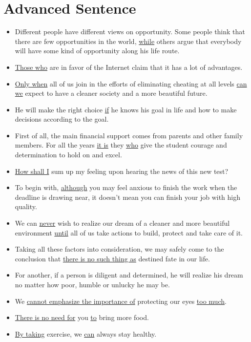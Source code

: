 \chapter{Advanced Sentence}
\begin{itemize}
    \item Different people have different views on opportunity. Some people think that
     there are few opportunities in the world, \uline{while} others argue that everybody will
      have some kind of opportunity along his life route.
    \item \uline{Those who} are in favor of the Internet claim that it has a lot of advantages.
    \item \uline{Only when} all of us join in the efforts of eliminating cheating at all levels
    \uline{can we} expect to have a cleaner society and a more beautiful future.
    \item He will make the right choice \uline{if} he knows his goal in life and how to make 
    decisions according to the goal.
    \item First of all, the main financial support comes from parents and other family
     members. For all the years \uline{it is} they \uline{who} give the student courage and 
     determination to hold on and excel.
    \item \uline{How shall I} sum up my feeling upon hearing the news of this new test?
    \item To begin with, \uline{although} you may feel anxious to finish the work when 
    the deadline is drawing near, it doesn't mean you can finish your job with 
    high quality.
    \item We can \uline{never} wish to realize our dream of a cleaner and more beautiful
     environment \uline{until} all of us take actions to build, protect and take care of it.
    \item Taking all these factors into consideration, we may safely come to the conclusion
     that \uline{there is no such thing as} destined fate in our life.
    \item For another, if a person is diligent and determined, he will realize his
     dream no matter how poor, humble or unlucky he may be.
    \item We \uline{cannot emphasize the importance of} protecting our eyes \uline{too much}.
    \item \uline{There is no need for} you \uline{to} bring more food.
    \item \uline{By taking} exercise, we \uline{can} always stay healthy.

\end{itemize}
